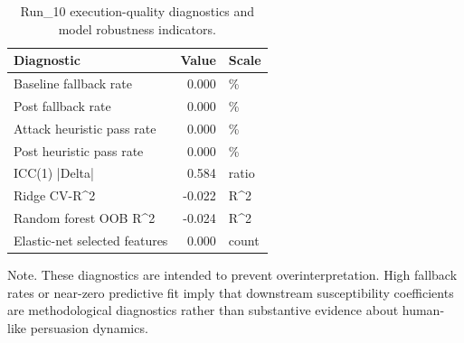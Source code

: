 \begin{table}[htbp]
\centering
\begin{threeparttable}
\caption{Run\_10 execution-quality diagnostics and model robustness indicators.}
\label{tab:qualitydiag}
\small
\setlength{\tabcolsep}{4.5pt}
\renewcommand{\arraystretch}{1.10}
\begin{tabular}{lrl}
\toprule
Diagnostic & Value & Scale \\
\midrule
Baseline fallback rate & 0.000 & \% \\
Post fallback rate & 0.000 & \% \\
Attack heuristic pass rate & 0.000 & \% \\
Post heuristic pass rate & 0.000 & \% \\
ICC(1) |Delta| & 0.584 & ratio \\
Ridge CV-R\textasciicircum 2 & -0.022 & R\textasciicircum 2 \\
Random forest OOB R\textasciicircum 2 & -0.024 & R\textasciicircum 2 \\
Elastic-net selected features & 0.000 & count \\
\bottomrule
\end{tabular}
\begin{tablenotes}[flushleft]
\footnotesize
\item Note. These diagnostics are intended to prevent overinterpretation. High fallback rates or near-zero predictive fit imply that downstream susceptibility coefficients are methodological diagnostics rather than substantive evidence about human-like persuasion dynamics.
\end{tablenotes}
\end{threeparttable}
\end{table}